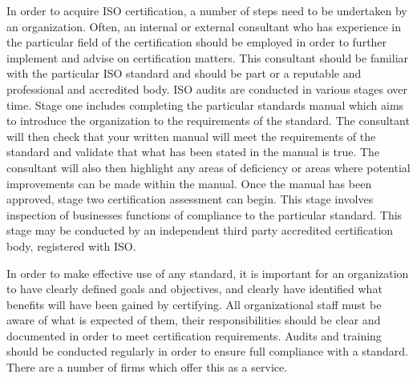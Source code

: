 \documentclass[11pt,a4paper]{article}
\begin{document}
\vspace{5mm}

In order to acquire ISO certification, a number of steps need to be undertaken by an organization. Often, an internal or external consultant who has experience in the particular field of the certification should be employed in order to further implement and advise on certification matters. This consultant should be familiar with the particular ISO standard and should be part or a reputable and professional and accredited body. ISO audits are conducted in various stages over time. Stage one includes completing the particular standards manual which aims to introduce the organization to the requirements of the standard. The consultant will then check that your written manual will meet the requirements of the standard and validate that what has been stated in the manual is true. The consultant will also then highlight any areas of deficiency or areas where potential improvements can be made within the manual. Once the manual has been approved, stage two certification assessment can begin. This stage involves inspection of businesses functions of compliance to the particular standard. This stage may be conducted by an independent third party accredited certification body, registered with ISO.

\vspace{5mm}

In order to make effective use of any standard, it is important for an organization to have clearly defined goals and objectives, and clearly have identified what benefits will have been gained by certifying. All organizational staff must be aware of what is expected of them, their responsibilities should be clear and documented in order to meet certification requirements. Audits and training should be conducted regularly in order to ensure full compliance with a standard. There are a number of firms which offer this as a service.

\vspace{5mm}
\end{document}
